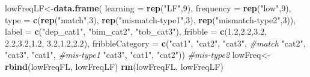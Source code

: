 \documentclass[
]{article}
\newenvironment{Shaded}{\begin{snugshade}}{\end{snugshade}}
\newcommand{\CommentTok}[1]{\textcolor[rgb]{0.56,0.35,0.01}{\textit{#1}}}
\newcommand{\DataTypeTok}[1]{\textcolor[rgb]{0.13,0.29,0.53}{#1}}
\newcommand{\DecValTok}[1]{\textcolor[rgb]{0.00,0.00,0.81}{#1}}
\newcommand{\FloatTok}[1]{\textcolor[rgb]{0.00,0.00,0.81}{#1}}
\newcommand{\KeywordTok}[1]{\textcolor[rgb]{0.13,0.29,0.53}{\textbf{#1}}}
\newcommand{\NormalTok}[1]{#1}
\newcommand{\StringTok}[1]{\textcolor[rgb]{0.31,0.60,0.02}{#1}}
\begin{document}
\begin{Shaded}
\begin{Highlighting}[]
\NormalTok{lowFreqLF<-}\KeywordTok{data.frame}\NormalTok{(}
           \DataTypeTok{learning =} \KeywordTok{rep}\NormalTok{(}\StringTok{"LF"}\NormalTok{,}\DecValTok{9}\NormalTok{),}
           \DataTypeTok{frequency =} \KeywordTok{rep}\NormalTok{(}\StringTok{"low"}\NormalTok{,}\DecValTok{9}\NormalTok{),}
           \DataTypeTok{type =} \KeywordTok{c}\NormalTok{(}\KeywordTok{rep}\NormalTok{(}\StringTok{"match"}\NormalTok{,}\DecValTok{3}\NormalTok{), }
                    \KeywordTok{rep}\NormalTok{(}\StringTok{"mismatch-type1"}\NormalTok{,}\DecValTok{3}\NormalTok{), }
                    \KeywordTok{rep}\NormalTok{(}\StringTok{"mismatch-type2"}\NormalTok{,}\DecValTok{3}\NormalTok{)),}
           \DataTypeTok{label =} \KeywordTok{c}\NormalTok{(}\StringTok{"dep_cat1"}\NormalTok{, }\StringTok{"bim_cat2"}\NormalTok{, }\StringTok{"tob_cat3"}\NormalTok{),}
           \DataTypeTok{fribble =} \KeywordTok{c}\NormalTok{(}\FloatTok{1.2}\NormalTok{,}\FloatTok{2.2}\NormalTok{,}\FloatTok{3.2}\NormalTok{,}
                       \FloatTok{2.2}\NormalTok{,}\FloatTok{3.2}\NormalTok{,}\FloatTok{1.2}\NormalTok{,}
                       \FloatTok{3.2}\NormalTok{,}\FloatTok{1.2}\NormalTok{,}\FloatTok{2.2}\NormalTok{),}
           \DataTypeTok{fribbleCategory =} \KeywordTok{c}\NormalTok{(}\StringTok{"cat1"}\NormalTok{, }\StringTok{"cat2"}\NormalTok{, }\StringTok{"cat3"}\NormalTok{, }\CommentTok{#match}
                               \StringTok{"cat2"}\NormalTok{, }\StringTok{"cat3"}\NormalTok{, }\StringTok{"cat1"}\NormalTok{, }\CommentTok{#mis-type1}
                               \StringTok{"cat3"}\NormalTok{, }\StringTok{"cat1"}\NormalTok{, }\StringTok{"cat2"}\NormalTok{)) }\CommentTok{#mis-type2}
\NormalTok{lowFreq<-}\StringTok{ }\KeywordTok{rbind}\NormalTok{(lowFreqFL, lowFreqLF)}
\KeywordTok{rm}\NormalTok{(lowFreqFL, lowFreqLF)}
\end{Highlighting}
\end{Shaded}
\end{document}
